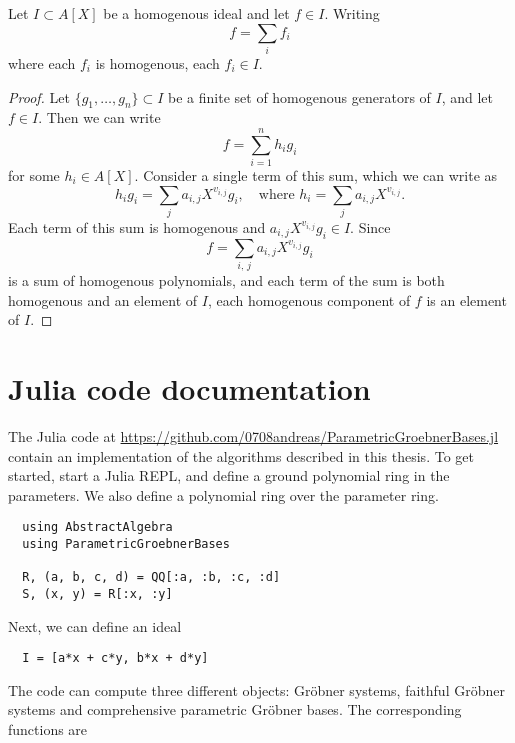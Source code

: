 \begin{lemma}\label{lem:homo_components}
  Let $I \subset A[X]$ be a homogenous ideal and let $f \in I$. Writing
  \[f = \sum_{i} f_{i}\]
  where each $f_{i}$ is homogenous, each $f_{i} \in I$.
\end{lemma}
\begin{proof}
  Let $\{g_{1}, \dots, g_{n}\} \subset I$ be a finite set of homogenous generators of $I$, and let $f \in I$. Then we can write
  \[f = \sum_{i=1}^{n} h_{i} g_{i}\]
  for some $h_{i} \in A[X]$. Consider a single term of this sum, which we can write as
  \[h_{i} g_{i} = \sum_{j} a_{i, j}X^{v_{i,j}} g_{i}, \quad \text{where } h_{i} = \sum_{j} a_{i, j}X^{v_{i,j}}.\]
  Each term of this sum is homogenous and $a_{i,j} X^{v_{i,j}} g_{i} \in I$. Since
  \[f = \sum_{i,\,j} a_{i,j} X^{v_{i, j}} g_{i}\]
  is a sum of homogenous polynomials, and each term of the sum is both homogenous and an element of $I$, each homogenous component of $f$ is an element of $I$.
\end{proof}





\section{Julia code documentation}
The Julia code at \url{https://github.com/0708andreas/ParametricGroebnerBases.jl} contain an implementation of the algorithms described in this thesis. To get started, start a Julia REPL, and define a ground polynomial ring in the parameters. We also define a polynomial ring over the parameter ring.

\begin{verbatim}
  using AbstractAlgebra
  using ParametricGroebnerBases

  R, (a, b, c, d) = QQ[:a, :b, :c, :d]
  S, (x, y) = R[:x, :y]
\end{verbatim}

Next, we can define an ideal

\begin{verbatim}
  I = [a*x + c*y, b*x + d*y]
\end{verbatim}

The code can compute three different objects: Gröbner systems, faithful Gröbner systems and comprehensive parametric Gröbner bases. The corresponding functions are

